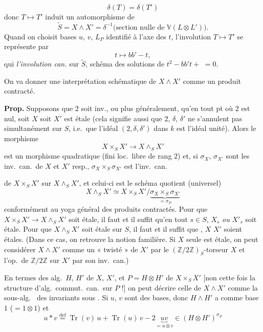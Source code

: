 \documentclass[11pt,a4paper]{article}
\begin{document}

\[
  \delta(T) = \delta(T')
\]
donc $T \mapsto T'$ induit un \struck{\ill{}} automorphisme de
\[
  \widetilde{S} = X \wedge X' = \delta^{-1}\bigl(\text{section nulle de } \mathbb{V}(L \otimes L')\bigr).
\]
Quand on choisit bases $u$, $v$,  $L_P$ identifié à l'axe des $t$, l'involution $T \mapsto T'$  se représente par
\[
  t \longmapsto bb' - t ,
\]
qui \struck{$\Rightarrow$}  \emph{l'involution can.} sur $\widetilde{S}$, schéma des solutions de $t^2 - bb't + {}$  $= 0$.

\marginal{$\triangle$} On va donner une interprétation schématique de $X \wedge X'$ comme un produit contracté.

\textbf{Prop.} Supposons que $2$ soit inv., ou plus généralement, qu'en tout pt où $2$ est nul, soit $X$ soit $X'$ est étale (cela signifie aussi que $2$, $\delta$, $\delta'$ ne s'annulent pas simultanément sur $S$, i.e.\ que l'idéal $(2, \delta, \delta')$ dans $k$ est l'idéal unité). Alors le \struck{\ill{}} morphisme
\[
  X \times_S X' \longrightarrow X \wedge_S X'
\]
est  un morphisme quadratique (fini loc.\ libre de rang $2$) et, si $\sigma_X$, $\sigma_{X'}$ sont les inv.\ can.\ de $X$ et $X'$ resp., $\sigma_X \times_S \sigma_{X'}$ est l'inv.\ can.

de $X \times_S X'$ sur $X \wedge_S X'$, et celui-ci est le  schéma quotient (universel)
\[
  X \wedge_S X' \simeq X \times_S X' \big/ \underbrace{\sigma_X \times_S \sigma_{X'}}_{= \sigma_P}
\]
conformément au yoga général des produits contractés. Pour que $X \times_S X' \to X \wedge_S X'$ soit étale, il faut et il suffit qu'en tout $s \in S$, $X_s$ \emph{ou} $X'_s$ soit étale. Pour que $X \wedge_S X'$ soit étale sur $S$, il faut et il suffit que , $X$  $X'$ soient étales. (Dans ce cas, on retrouve la notion familière. Si $X$ seule est étale, on peut considérer $X \wedge X'$ comme un « twisté » de $X'$ par le $(\mathbb{Z}/2\mathbb{Z})_S$-torseur $X$ et l'op.\ de $\mathbb{Z}/2\mathbb{Z}$ sur $X'$ par son inv.\ can.)

En termes des alg.\ $H$, $H'$ de $X$, $X'$, et $P = H \otimes H'$ de $X \times_S X'$ [non cette fois la structure d'alg.\ commut.\ can.\ sur $P$ !] on peut décrire celle de $X \wedge X'$ comme la sous-alg.\  des invariants sous . Si $u$, $v$ sont des bases, donc $H \wedge H'$ a comme base $1$ ($= 1 \otimes 1$) et
\[
  \boxed{\; u * v \overset{\mathrm{def}}{=} \operatorname{Tr}(v)\,u + \operatorname{Tr}(u)\,v - 2\underbrace{uv}_{= u \otimes v} \in (H \otimes H')^{\sigma_P} \;}
\]
\end{document}
